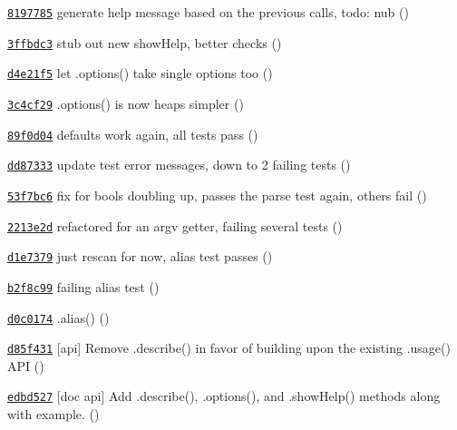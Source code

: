 \begin{DoxyItemize}
\item \href{https://github.com/bcoe/yargs/commit/8197785ad4762465084485b041abd722f69bf344}{\tt 8197785} generate help message based on the previous calls, todo\+: nub ()
\item \href{https://github.com/bcoe/yargs/commit/3ffbdc33c8f5e83d4ea2ac60575ce119570c7ede}{\tt 3ffbdc3} stub out new show\+Help, better checks ()
\item \href{https://github.com/bcoe/yargs/commit/d4e21f56a4830f7de841900d3c79756fb9886184}{\tt d4e21f5} let .options() take single options too ()
\item \href{https://github.com/bcoe/yargs/commit/3c4cf2901a29bac119cca8e983028d8669230ec6}{\tt 3c4cf29} .options() is now heaps simpler ()
\item \href{https://github.com/bcoe/yargs/commit/89f0d043cbccd302f10ab30c2069e05d2bf817c9}{\tt 89f0d04} defaults work again, all tests pass ()
\item \href{https://github.com/bcoe/yargs/commit/dd8733365423006a6e4156372ebb55f98323af58}{\tt dd87333} update test error messages, down to 2 failing tests ()
\item \href{https://github.com/bcoe/yargs/commit/53f7bc626b9875f2abdfc5dd7a80bde7f14143a3}{\tt 53f7bc6} fix for bools doubling up, passes the parse test again, others fail ()
\item \href{https://github.com/bcoe/yargs/commit/2213e2ddc7263226fba717fb041dc3fde9bc2ee4}{\tt 2213e2d} refactored for an argv getter, failing several tests ()
\item \href{https://github.com/bcoe/yargs/commit/d1e737970f15c6c006bebdd8917706827ff2f0f2}{\tt d1e7379} just rescan for now, alias test passes ()
\item \href{https://github.com/bcoe/yargs/commit/b2f8c99cc477a8eb0fdf4cf178e1785b63185cfd}{\tt b2f8c99} failing alias test ()
\item \href{https://github.com/bcoe/yargs/commit/d0c0174daa144bfb6dc7290fdc448c393c475e15}{\tt d0c0174} .alias() ()
\item \href{https://github.com/bcoe/yargs/commit/d85f431ad7d07b058af3f2a57daa51495576c164}{\tt d85f431} \mbox{[}api\mbox{]} Remove {\ttfamily .describe()} in favor of building upon the existing {\ttfamily .usage()} A\+PI ()
\item \href{https://github.com/bcoe/yargs/commit/edbd5272a8e213e71acd802782135c7f9699913a}{\tt edbd527} \mbox{[}doc api\mbox{]} Add {\ttfamily .describe()}, {\ttfamily .options()}, and {\ttfamily .show\+Help()} methods along with example. ()

\end{DoxyItemize}
